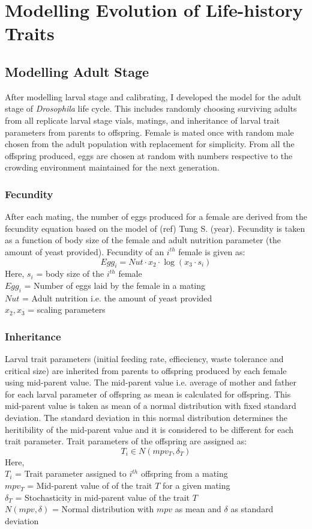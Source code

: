 \chapter{Modelling Evolution of Life-history Traits}

\section{Modelling Adult Stage}
After modelling larval stage and calibrating, I developed the model for the adult stage of \textit{Drosophila} life cycle. This includes randomly choosing surviving adults from all replicate larval stage vials, matings, and inheritance of larval trait parameters from parents to offspring. Female is mated once with random male chosen from the adult population with replacement for simplicity. From all the offspring produced, eggs are chosen at random with numbers respective to the crowding environment maintained for the next generation.
\subsection{Fecundity}
After each mating, the number of eggs produced for a female are derived from the fecundity equation based on the model of (ref) Tung S. (year). Fecundity is taken as a function of body size of the female and adult nutrition parameter (the amount of yeast provided). Fecundity of an $i^{th}$ female is given as:
\[Egg_{i} = Nut \cdot x_{2} \cdot \log{(x_{3} \cdot s_{i})}\]
Here, $s_{i}$ = body size of the $i^{th}$ female \\
$Egg_{i}$ = Number of eggs laid by the female in a mating \\
$Nut$ = Adult nutrition i.e. the amount of yeast provided \\
$x_{2}, x_{3}$ = scaling parameters
\subsection{Inheritance}
Larval trait parameters (initial feeding rate, effieciency, waste tolerance and critical size) are inherited from parents to offspring produced by each female using mid-parent value. The mid-parent value i.e. average of mother and father for each larval parameter of offspring as mean is calculated for offspring. This mid-parent value is taken as mean of a normal distribution with fixed standard deviation. The standard deviation in this normal distribution determines the heritibility of the mid-parent value and it is considered to be different for each trait parameter. Trait parameters of the offspring are assigned as:
\[T_{i} \in N(mpv_{T}, \delta_{T})\]
Here, \\
$T_{i}$ = Trait parameter assigned to $i^{th}$ offspring from a mating \\
$mpv_{T}$ = Mid-parent value of of the trait $T$ for a given mating \\
$\delta_{T}$ = Stochasticity in mid-parent value of the trait $T$ \\
$N(mpv, \delta)$ = Normal distribution with $mpv$ as mean and $\delta$ as standard deviation
